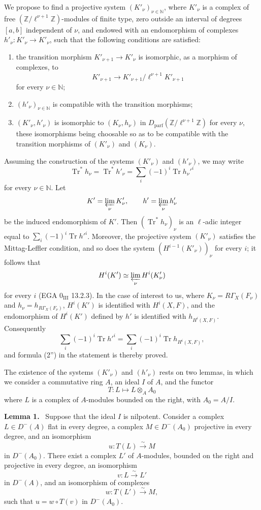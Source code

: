 \documentclass[11pt]{article}
\newenvironment{statement}[1]{\par\medskip\noindent\textbf{#1.}\ }{\par\medskip}
\providecommand{\Tr}{\operatorname{Tr}}
\providecommand{\Tr}{\operatorname{Tr}}
\providecommand{\Tr}{\operatorname{Tr}}
\providecommand{\Tr}{\operatorname{Tr}}
\providecommand{\Tr}{\operatorname{Tr}}
\begin{document}
We propose to find a projective system $(K'_\nu)_{\nu\in\mathbb N}$, where $K'_\nu$ is a complex of free $(\mathbb Z/\ell^{\nu+1}\mathbb Z)$-modules of finite type, zero outside an interval of degrees $[a,b]$ independent of $\nu$, and endowed with an endomorphism of complexes $h'_\nu:K'_\nu\to K'_\nu$, such that the following conditions are satisfied:
\begin{enumerate}[label=\arabic*)]
\item the transition morphism $K'_{\nu+1}\to K'_\nu$ is isomorphic, as a morphism of complexes, to
\[
K'_{\nu+1}\to K'_{\nu+1}/\ell^{\nu+1}K'_{\nu+1}
\]
for every $\nu\in\mathbb N$;
\item $(h'_\nu)_{\nu\in\mathbb N}$ is compatible with the transition morphisms;
\item $(K'_\nu,h'_\nu)$ is isomorphic to $(K_\nu,h_\nu)$ in $D_{\mathrm{parf}}(\mathbb Z/\ell^{\nu+1}\mathbb Z)$ for every $\nu$, these isomorphisms being choosable so as to be compatible with the transition morphisms of $(K'_\nu)$ and $(K_\nu)$.
\end{enumerate}
Assuming the construction of the systems $(K'_\nu)$ and $(h'_\nu)$, we may write
\[
\Tr^*h_\nu=\Tr^*h'_\nu=\sum_i(-1)^i\Tr h_\nu'^i
\]
for every $\nu\in\mathbb N$. Let
\[
K'=\varprojlim_\nu K'_\nu,
\qquad h'=\varprojlim_\nu h'_\nu
\]
be the induced endomorphism of $K'$. Then $(\Tr^*h_\nu)_\nu$ is an $\ell$-adic integer equal to $\sum_i(-1)^i\Tr h'^i$. Moreover, the projective system $(K'_\nu)$ satisfies the Mittag-Leffler condition, and so does the system $(H^{i-1}(K'_\nu))_\nu$ for every $i$; it follows that
\[
H^i(K')\simeq\varprojlim_\nu H^i(K'_\nu)
\]
for every $i$ (EGA $0_{\mathrm{III}}$ 13.2.3). In the case of interest to us, where $K_\nu=R\Gamma_X(F_\nu)$ and $h_\nu=h_{R\Gamma_X(F_\nu)}$, $H^i(K')$ is identified with $H^i(X,F)$, and the endomorphism of $H^i(K')$ defined by $h'$ is identified with $h_{H^i(X,F)}$. Consequently
\[
\sum_i(-1)^i\Tr h'^i=
\sum_i(-1)^i\Tr h_{H^i(X,F)},
\]
and formula (2'') in the statement is thereby proved.

The existence of the systems $(K'_\nu)$ and $(h'_\nu)$ rests on two lemmas, in which we consider a commutative ring $A$, an ideal $I$ of $A$, and the functor
\[
T:L\longmapsto L\otimes_A A_0
\]
where $L$ is a complex of $A$-modules bounded on the right, with $A_0=A/I$.

\begin{statement}{Lemma 1}
Suppose that the ideal $I$ is nilpotent. Consider a complex $L\in D^-(A)$ flat in every degree, a complex $M\in D^-(A_0)$ projective in every degree, and an isomorphism
\[
u:T(L)\xrightarrow{\sim}M
\]
in $D^-(A_0)$. There exist a complex $L'$ of $A$-modules, bounded on the right and projective in every degree, an isomorphism
\[
v:L\xrightarrow{\sim}L'
\]
in $D^-(A)$, and an isomorphism of complexes
\[
w:T(L')\xrightarrow{\sim}M,
\]
such that $u=w\circ T(v)$ in $D^-(A_0)$.
\end{statement}
\end{document}
